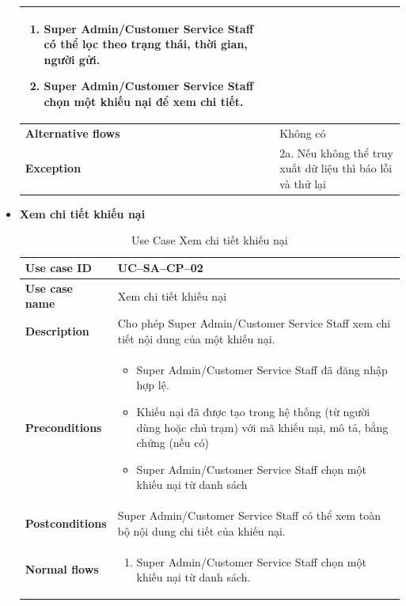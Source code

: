 \begin{itemize}
\begin{center}
\begin{longtable}{|m{}|m{}|}
\begin{enumerate}[label=\arabic*.]
        \item Super Admin/Customer Service Staff có thể lọc theo trạng thái, thời gian, người gửi.
        \item Super Admin/Customer Service Staff chọn một khiếu nại để xem chi tiết.
      \end{enumerate}\\
      \hline
      \textbf{Alternative flows} &
      Không có\\
      \hline
      \textbf{Exception} &
      2a. Nếu không thể truy xuất dữ liệu thì báo lỗi và thử lại\\
      \hline
      \end{longtable}
  \end{center}
\item \textbf{Xem chi tiết khiếu nại}
  \begin{center}
    \renewcommand{\arraystretch}{1.5}
    \begin{longtable}{|m{}|m{}|}
          \caption{Use Case Xem chi tiết khiếu nại}
      \label{tab:uc_sa_cp_02} \\
      \hline
      \textbf{Use case ID} & UC--SA--CP--02 \\
      \hline
      \textbf{Use case name} & Xem chi tiết khiếu nại \\
      \hline
      \textbf{Description} & Cho phép Super Admin/Customer Service Staff xem chi tiết nội dung của một khiếu nại.\\
      \hline
      \textbf{Preconditions} &
      \begin{itemize}
        \item Super Admin/Customer Service Staff đã đăng nhập hợp lệ.
        \item Khiếu nại đã được tạo trong hệ thống (từ người dùng hoặc chủ trạm) với mã khiếu nại, mô tả, bằng chứng (nếu có)
        \item Super Admin/Customer Service Staff chọn một khiếu nại từ danh sách
      \end{itemize}\\
      \hline
      \textbf{Postconditions} &
      Super Admin/Customer Service Staff có thể xem toàn bộ nội dung chi tiết của khiếu nại.\\
      \hline
      \textbf{Normal flows} &
      \begin{enumerate}[label=\arabic*.]
        \item Super Admin/Customer Service Staff chọn một khiếu nại từ danh sách.

\end{enumerate}
\end{longtable}
\end{center}
\end{itemize}
